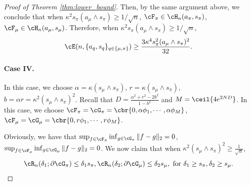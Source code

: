 \documentclass[11pt]{article}
\begin{document}
\begin{proof}[Proof of Theorem \ref{thm:lower_bound}]
Then, by the same argument above, we conclude that when $\kappa^2s_\pi(a_\mu\wedge s_\pi)\ge 1/\sqrt{n}$, $\cF_\pi\in\cH_n(a_\pi,s_\pi)$, $\cF_\mu\in\cH_n(a_\mu,s_\mu)$. Therefore, when $\kappa^2s_\pi(a_\mu\wedge s_\pi)\ge 1/\sqrt{n}$, 
\[
\cE(n,\{a_q,s_q\}_{q\in\{\mu,\pi\}})\ge \frac{3\kappa^4s_\pi^2(a_\mu\wedge s_\pi)^2}{32}.
\]
\paragraph{Case IV.} In this case, we choose $\alpha=\kappa(s_\mu\wedge s_\pi)$, $r=\kappa (s_\mu\wedge s_\pi)$, $b=\alpha r=\kappa^2(s_\mu\wedge s_\pi)^2$. Recall that $D=\frac{\alpha^2+r^2-2b^2}{1-b^2}$ and $M=\ceil{4e^{2ND}}$. In this case, we choose $\cF_\pi=\cG_\pi=\cbr{0,\alpha\phi_1,\cdots,\alpha\phi_M}$, $\cF_\mu=\cG_\mu=\cbr{0,r\phi_1,\cdots,r\phi_M}$. 

Obviously, we have that $\sup_{f\in\cF_\pi}\inf_{g\in\cG_\pi}\|f-g\|_2=0$, $\sup_{f\in\cF_\mu}\inf_{g\in\cG_\mu}\|f-g\|_2=0$. We now claim that when $\kappa^2(s_\mu\wedge s_\pi)^2\ge\frac{1}{\sqrt{n}}$, $$\cR_n(\delta_1;\partial\cG_\pi)\le \delta_1 s_\pi, \cR_n(\delta_2;\partial\cG_\mu)\le \delta_2 s_\mu,\ \text{for}\ \delta_1\ge s_\pi,\delta_2\ge s_\mu.$$ 


\end{proof}
\end{document}
